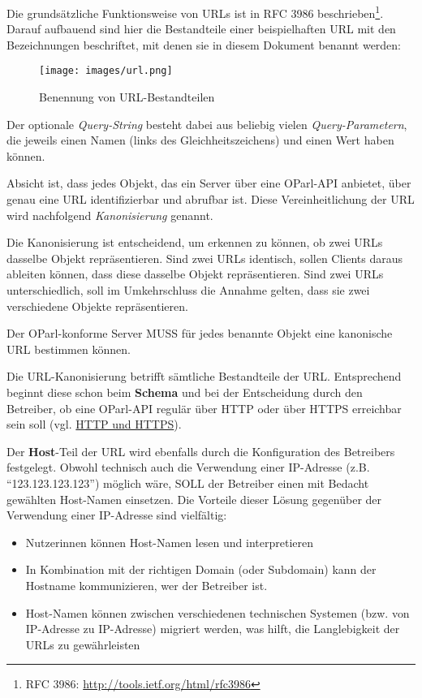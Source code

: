 \documentclass[,a4paper]{article}
\makeatletter
\def\maxwidth{\ifdim\Gin@nat@width>\linewidth\linewidth
\else\Gin@nat@width\fi}
\let\Oldincludegraphics\includegraphics
\renewcommand{\includegraphics}[1]{\Oldincludegraphics[width=\maxwidth]{#1}}
\makeatother
\begin{document}
Die grundsätzliche Funktionsweise von URLs ist in RFC 3986
beschrieben\footnote{RFC 3986: \url{http://tools.ietf.org/html/rfc3986}}.
Darauf aufbauend sind hier die Bestandteile einer beispielhaften URL mit
den Bezeichnungen beschriftet, mit denen sie in diesem Dokument benannt
werden:

\begin{figure}[htbp]
\centering
\texttt{[image: images/url.png]}
\caption{Benennung von URL-Bestandteilen}
\end{figure}

Der optionale \emph{Query-String} besteht dabei aus beliebig vielen
\emph{Query-Parametern}, die jeweils einen Namen (links des
Gleichheitszeichens) und einen Wert haben können.


Absicht ist, dass jedes Objekt, das ein Server über eine OParl-API
anbietet, über genau eine URL identifizierbar und abrufbar ist. Diese
Vereinheitlichung der URL wird nachfolgend \emph{Kanonisierung} genannt.

Die Kanonisierung ist entscheidend, um erkennen zu können, ob zwei URLs
dasselbe Objekt repräsentieren. Sind zwei URLs identisch, sollen Clients
daraus ableiten können, dass diese dasselbe Objekt repräsentieren. Sind
zwei URLs unterschiedlich, soll im Umkehrschluss die Annahme gelten,
dass sie zwei verschiedene Objekte repräsentieren.

Der OParl-konforme Server MUSS für jedes benannte Objekt eine kanonische
URL bestimmen können.

Die URL-Kanonisierung betrifft sämtliche Bestandteile der URL.
Entsprechend beginnt diese schon beim \textbf{Schema} und bei der
Entscheidung durch den Betreiber, ob eine OParl-API regulär über HTTP
oder über HTTPS erreichbar sein soll (vgl.
\hyperref[http-und-https]{HTTP und HTTPS}).

Der \textbf{Host}-Teil der URL wird ebenfalls durch die Konfiguration
des Betreibers festgelegt. Obwohl technisch auch die Verwendung einer
IP-Adresse (z.B. ``123.123.123.123'') möglich wäre, SOLL der Betreiber
einen mit Bedacht gewählten Host-Namen einsetzen. Die Vorteile dieser
Lösung gegenüber der Verwendung einer IP-Adresse sind vielfältig:

\begin{itemize}
\itemsep1pt\parskip0pt
\item
  Nutzerinnen können Host-Namen lesen und interpretieren
\item
  In Kombination mit der richtigen Domain (oder Subdomain) kann der
  Hostname kommunizieren, wer der Betreiber ist.
\item
  Host-Namen können zwischen verschiedenen technischen Systemen (bzw.
  von IP-Adresse zu IP-Adresse) migriert werden, was hilft, die
  Langlebigkeit der URLs zu gewährleisten
\end{itemize}
\end{document}
